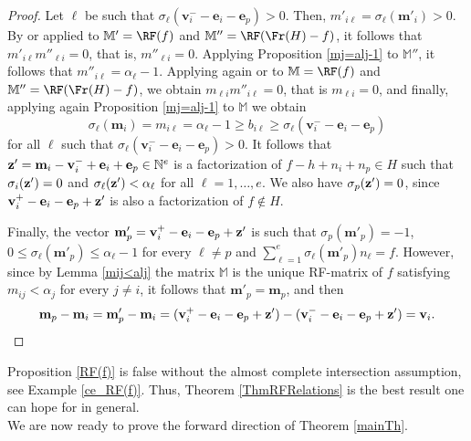 \documentclass[11pt,twoside]{amsart}
\newcommand{\N}{\mathbb N}
\def\bv{{\mathbf v}}
\def\be{{\mathbf e}}
\def\bm{{\mathbf m}}
\def\bbM{{\mathbb M}}
\theoremstyle{definition}
\numberwithin{equation}{section}
\begin{document}
\begin{proof}
Let $\ell$ be  such that $\sigma_\ell(\bv_i^--\be_i-\be_p) > 0$. 
 Then, 
 $m'_{i\ell}=\sigma_\ell(\bm'_i) > 0$. 
By \cite[Proposition 4]{Mo} or \cite[Lemma 2.1]{E} applied to $\bbM'=\RF(f)$ and $\bbM''=\RF(\Fr(H)-f)$, it follows that
$m'_{i\ell}m''_{\ell i}=0$, that is, $m''_{\ell i}=0$. 
Applying Proposition \ref{mj=alj-1} to $\bbM''$,
it follows that $m''_{i\ell}=\alpha_\ell-1$.
Applying again  \cite[Proposition 4]{Mo} or \cite[Lemma 2.1]{E}  to $\bbM=\RF(f)$ and $\bbM''=\RF(\Fr(H)-f)$, we obtain $m_{\ell i}m''_{i\ell}=0$, that is $m_{\ell i}=0$, and finally, applying again  Proposition \ref{mj=alj-1} to $\bbM$ we obtain 
$$
\sigma_\ell(\bm_i)=m_{i\ell}=\alpha_{\ell}-1 \ge b_{i\ell}\ge\sigma_\ell(\bv_i^--\be_i-\be_p)$$
 for all $\ell$ such that $\sigma_\ell(\bv_i^--\be_i-\be_p)>0$.
It follows that ${\bf z}'=\bm_i-\bv_i^-+\be_i+\be_p \in \N^e$ is a factorization of $f-h+n_i+n_p\in H$ such that $\sigma_i({\bf z}')= 0$ and  $\sigma_\ell({\bf z}') < \alpha_\ell$ for all $\ell=1,\ldots,e$. 
We also have $\sigma_p({\bf z}')=0$, since
$\bv_i^+-\be_i-\be_p+{\bf z}'$ is also a factorization of $f \notin H$.



Finally, the vector $\bm'_p = \bv_i^+ - \be_i - \be_p + {\bf z}'$ is such that $\sigma_p(\bm'_p) = -1$, $0 \le \sigma_\ell(\bm'_p) \le \alpha_\ell-1$ for every $\ell \ne p$ and $\sum_{\ell=1}^e \sigma_\ell(\bm'_p)n_\ell=f$. However, since by Lemma \ref{mij<alj} the matrix $\bbM$ is the unique RF-matrix of $f$ satisfying $m_{ij} < \alpha_j$ for every $j \ne i$, it follows that $\bm'_p=\bm_p$, and then
\begin{equation*}
\bm_p-\bm_i=\bm'_p-\bm_i=(\bv_i^+ - \be_i - \be_p + {\bf z}')-(\bv_i^- - \be_i - \be_p + {\bf z}')=\bv_i.\qedhere    
\end{equation*}
\end{proof}

Proposition \ref{RF(f)} is false without the almost complete intersection assumption, see Example \ref{ce_RF(f)}.
Thus, Theorem \ref{ThmRFRelations} is the best result one can hope for in general.
\\


We are now ready to prove the forward direction of Theorem \ref{mainTh}.
\end{document}
